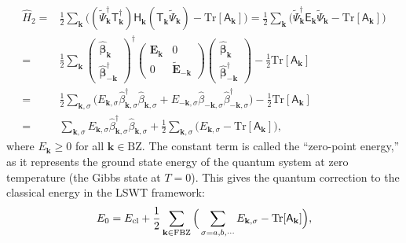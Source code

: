\documentclass[aps, prx, nofootinbib, superscriptaddress]{revtex4-2}
\newcommand{\Tr}{\mathrm{Tr}}
\begin{document}
\begin{align}
    \hat{H}_{2}
    = & \frac{1}{2} \sum_{\mathbf{k}} 
    \Big( (\widetilde{\Psi}^{\dagger}_{\mathbf{k}} \mathsf{T}_{\mathbf{k}}^{\dagger}) \mathsf{H}_{\mathbf{k}}^{\phantom \dagger} (\mathsf{T}_{\mathbf{k}}^{\phantom \dagger} \widetilde{\Psi}_{\mathbf{k}}^{\phantom \dagger} )- \Tr [\mathsf{A}_{\mathbf{k}}] \Big) 
    = \frac{1}{2} \sum_{\mathbf{k}} 
    \Big( \widetilde{\Psi}^{\dagger}_{\mathbf{k}} \mathsf{E}_{\mathbf{k}} \widetilde{\Psi}_{\mathbf{k}} - \Tr [\mathsf{A}_{\mathbf{k}}] \Big) \nonumber \\
    = & \frac{1}{2} \sum_{\mathbf{k}} 
    \begin{pmatrix}
        \hat{\bm \beta}_{\mathbf{k}} \\
        \hat{\bm \beta}_{-\mathbf{k}}^{\dagger}
    \end{pmatrix}^{\dagger}
    \begin{pmatrix}
        \mathbf{E}_{\mathbf{k}} & 0 \\ 0 & \widetilde{\mathbf{E}}_{-\mathbf{k}}
    \end{pmatrix}
    \begin{pmatrix}
        \hat{\bm \beta}_{\mathbf{k}} \\
        \hat{\bm \beta}_{-\mathbf{k}}^{\dagger}
    \end{pmatrix} 
    - \frac{1}{2} \Tr [\mathsf{A}_{\mathbf{k}}]
    \nonumber \\
    = & \frac{1}{2} \sum_{\mathbf{k}, \sigma} 
    \big( 
        E_{\mathbf{k}, \sigma} \hat{\beta}^{\dagger}_{\mathbf{k}, \sigma}   \hat{\beta}^{\phantom \dagger}_{\mathbf{k}, \sigma} +
        E_{-\mathbf{k}, \sigma} \hat{\beta}^{\phantom \dagger}_{-\mathbf{k}, \sigma} \hat{\beta}^{\dagger}_{-\mathbf{k}, \sigma}
    \big) 
    - \frac{1}{2} \Tr [\mathsf{A}_{\mathbf{k}}] \\
    = & \sum_{\mathbf{k}, \sigma} E_{\mathbf{k}, \sigma} \hat{\beta}_{\mathbf{k}, \sigma}^{\dagger} \hat{\beta}_{\mathbf{k}, \sigma}^{\phantom \dagger} 
    + \frac{1}{2} \sum_{\mathbf{k}, \sigma} \big( E_{\mathbf{k}, \sigma} - \Tr [\mathsf{A}_{\mathbf{k}}] \big),
\end{align}
where $E_{\mathbf{k}} \ge 0$ for all $\mathbf{k} \in \mathrm{BZ}$. 
The constant term is called the ``zero-point energy,'' as it represents the ground state energy of the quantum system at zero temperature (the Gibbs state at $T=0$).
This gives the quantum correction to the classical energy in the LSWT framework:
\begin{equation}\label{eq: def. of zero point energy}
    E_{0} = E_{\rm cl} + \frac{1}{2} \sum_{\mathbf{k} \in \mathrm{FBZ}} \Big( \sum_{\sigma=a,b,\cdots} E_{\mathbf{k}, \sigma} -  \Tr[\mathsf{A}_{\mathbf{k}}] \Big),
\end{equation}
\end{document}
